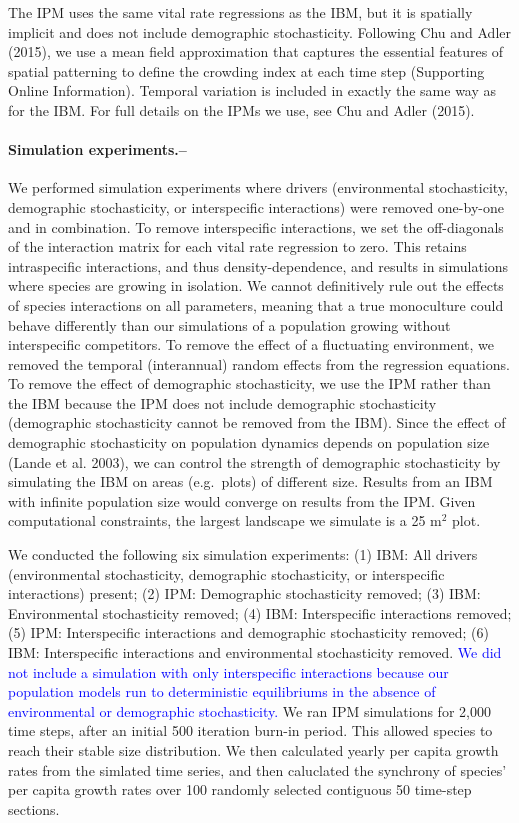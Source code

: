 \documentclass[12pt,]{article}
\begin{document}
The IPM uses the same vital rate regressions as the IBM, but it is
spatially implicit and does not include demographic stochasticity.
Following Chu and Adler (2015), we use a mean field approximation that
captures the essential features of spatial patterning to define the
crowding index at each time step (Supporting Online Information).
Temporal variation is included in exactly the same way as for the IBM.
For full details on the IPMs we use, see Chu and Adler (2015).

\paragraph{Simulation experiments.--}\label{simulation-experiments.}

We performed simulation experiments where drivers (environmental
stochasticity, demographic stochasticity, or interspecific interactions)
were removed one-by-one and in combination. To remove interspecific
interactions, we set the off-diagonals of the interaction matrix for
each vital rate regression to zero. This retains intraspecific
interactions, and thus density-dependence, and results in simulations
where species are growing in isolation. We cannot definitively rule out
the effects of species interactions on all parameters, meaning that a
true monoculture could behave differently than our simulations of a
population growing without interspecific competitors. To remove the
effect of a fluctuating environment, we removed the temporal
(interannual) random effects from the regression equations. To remove
the effect of demographic stochasticity, we use the IPM rather than the
IBM because the IPM does not include demographic stochasticity
(demographic stochasticity cannot be removed from the IBM). Since the
effect of demographic stochasticity on population dynamics depends on
population size (Lande et al. 2003), we can control the strength of
demographic stochasticity by simulating the IBM on areas (e.g.~plots) of
different size. Results from an IBM with infinite population size would
converge on results from the IPM. Given computational constraints, the
largest landscape we simulate is a 25 \(\text{m}^2\) plot.

We conducted the following six simulation experiments: (1) IBM: All
drivers (environmental stochasticity, demographic stochasticity, or
interspecific interactions) present; (2) IPM: Demographic stochasticity
removed; (3) IBM: Environmental stochasticity removed; (4) IBM:
Interspecific interactions removed; (5) IPM: Interspecific interactions
and demographic stochasticity removed; (6) IBM: Interspecific
interactions and environmental stochasticity removed.
\textcolor{blue}{We did not include a simulation with only interspecific interactions because our population models run to deterministic equilibriums in the absence of environmental or demographic stochasticity.}
We ran IPM simulations for 2,000 time steps, after an initial 500
iteration burn-in period. This allowed species to reach their stable
size distribution. We then calculated yearly per capita growth rates
from the simlated time series, and then caluclated the synchrony of
species' per capita growth rates over 100 randomly selected contiguous
50 time-step sections.
\end{document}
